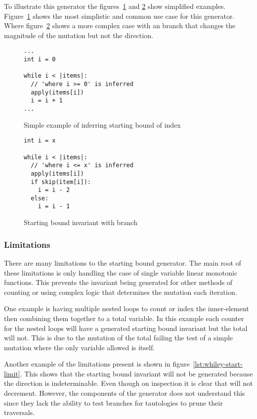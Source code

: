 To illustrate this generator the figures~\ref{lst:whiley-start} and \ref{lst:whiley-start-if}
show simplified examples.
Figure~\ref{lst:whiley-start} shows the most simplistic and common use case for this
generator. Where figure~\ref{lst:whiley-start-if} shows a more complex case 
with an  branch that changes the magnitude of the mutation but not the direction. 

\begin{figure}[ht]
\begin{lstlisting}
...
int i = 0

while i < |items|:
  // 'where i >= 0' is inferred
  apply(items[i])
  i = i + 1
...
\end{lstlisting}
\caption{Simple example of inferring starting bound of index}
\label{lst:whiley-start}
\end{figure}

\begin{figure}[ht]
\begin{lstlisting}
int i = x

while i < |items|:
  // 'where i <= x' is inferred
  apply(items[i])
  if skip(item[i]):
    i = i - 2
  else:
    i = i - 1
\end{lstlisting}
\caption{Starting bound invariant with branch}
\label{lst:whiley-start-if}
\end{figure}

\subsubsection{Limitations}

There are many limitations to the starting bound generator.
The main root of these limitations is only handling the case
of single variable linear monotonic functions. 
This prevents the invariant being generated for other
methods of counting or using complex logic that determines
the mutation each iteration.

One example is having multiple nested loops to count or index
the inner-element then combining them together to a total variable.
In this example each counter for the nested loops will have a generated
starting bound invariant but the total will not.
This is due to the mutation of the total failing the test of a simple
mutation where the only variable allowed is itself.

Another example of the limitations present is shown in figure~\ref{lst:whiley-start-limit}.
This shows that the starting bound invariant will not be generated because
the direction is indeterminable.
Even though on inspection it is clear that  will not decrement.
However, the components of the generator does not understand this
since they lack the ability to test branches for tautologies
to prune their traversals. 

